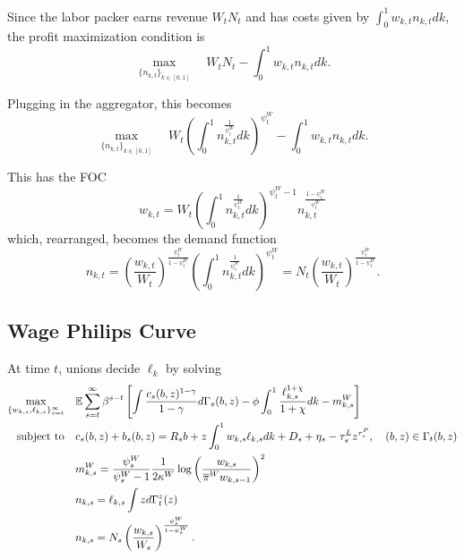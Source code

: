 Since the labor packer earns revenue $W_t N_t$ and has costs given by $\int_0^1 w_{k, t} n_{k, t} dk$, the profit maximization condition is
\begin{equation*}
    \max_{\{n_{k, t}\}_{k\in[0, 1]}} \quad W_t N_t - \int_0^1 w_{k, t} n_{k, t} dk.
\end{equation*}

Plugging in the aggregator, this becomes
\begin{equation*}
    \max_{\{n_{k, t}\}_{k\in[0, 1]}} \quad W_t \left(\int_0^1 n_{k, t}^\frac{1}{\psi_t^W} dk\right)^{\psi_t^W} - \int_0^1 w_{k, t} n_{k, t} dk.
\end{equation*}

This has the FOC
\begin{equation*}
    w_{k, t} = W_t \left(\int_0^1 n_{k, t}^\frac{1}{\psi_t^W} dk\right)^{\psi_t^W - 1} n_{k, t}^\frac{1 - \psi_t^W}{\psi_t^W}
\end{equation*}
which, rearranged, becomes the demand function
\begin{equation*}
    n_{k, t} = \left(\frac{w_{k, t}}{W_t}\right)^\frac{\psi_t^W}{1 - \psi_t^W} \left(\int_0^1 n_{k, t}^\frac{1}{\psi_t^W} dk\right)^{\psi_t^W} = N_t \left(\frac{w_{k, t}}{W_t}\right)^\frac{\psi_t^W}{1 - \psi_t^W}.
\end{equation*}


\subsection{Wage Philips Curve}

At time $t$, unions decide $\ell_k$ by solving
\begin{alignat*}{4}
    \max_{\{w_{k, s}, \ell_{k, s}\}_{s = t}^\infty} \quad & \mathbb{E} \sum_{s = t}^\infty \beta^{s - t} \left[ \int  \frac{c_s(b, z)^{1 - \gamma}}{1 - \gamma} d\Gamma_s(b, z) - \phi \int_0^1 \frac{\ell_{k, s}^{1 + \chi}}{1 + \chi} dk - m_{k, s}^W\right] \\
    \text{subject to} \quad & c_s (b, z) + b_s (b, z) = R_s b + z \int_0^1 w_{k, s} \ell_{k, s} dk + D_s + \eta_s - \tau_s^L z^{\tau_s^P}, \quad (b, z) \in \Gamma_t(b, z) \\
    & m_{k, s}^W = \frac{\psi_s^W}{\psi_s^W - 1} \frac{1}{2 \kappa^W} \log\left(\frac{w_{k, s}}{\overline{\pi}^W w_{k, s-1}}\right)^2 \\
    & n_{k, s} = \ell_{k, s} \int z d\Gamma_t^z(z) \\
    & n_{k, s} = N_s \left(\frac{w_{k, s}}{W_s}\right)^\frac{\psi_s^W}{1 - \psi_s^W}.
\end{alignat*}

